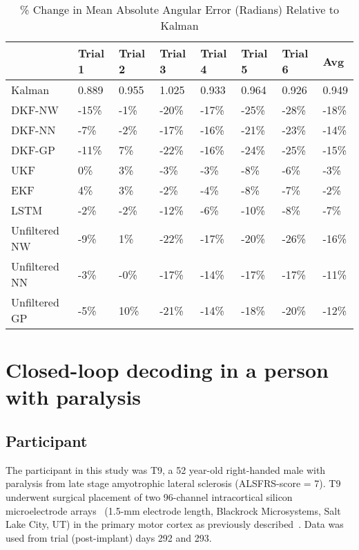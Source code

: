 \begin{table*}[ht]
\centering
\caption{\% Change in Mean Absolute Angular Error (Radians) Relative to Kalman}
\label{t:monkey_maae}
\begin{tabular}{|l|llllll|l|}
\hline
              & Trial 1 & Trial 2 & Trial 3 & Trial 4 & Trial 5 & Trial 6 & Avg   \\ \hline
Kalman        & 0.889   & 0.955   & 1.025   & 0.933   & 0.964   & 0.926   & 0.949 \\ \hline
DKF-NW        & -15\%   & -1\%    & -20\%   & -17\%   & -25\%   & -28\%   & -18\% \\
DKF-NN        & -7\%    & -2\%    & -17\%   & -16\%   & -21\%   & -23\%   & -14\% \\
DKF-GP        & -11\%   & 7\%     & -22\%   & -16\%   & -24\%   & -25\%   & -15\% \\ \hline
UKF           & 0\%     & 3\%     & -3\%    & -3\%    & -8\%    & -6\%    & -3\%  \\ 
EKF           & 4\%     & 3\%     & -2\%    & -4\%    & -8\%    & -7\%    & -2\%  \\ \hline
LSTM          & -2\%    & -2\%    & -12\%   & -6\%    & -10\%   & -8\%    & -7\%  \\ \hline
Unfiltered NW & -9\%    & 1\%     & -22\%   & -17\%   & -20\%   & -26\%   & -16\% \\ 
Unfiltered NN & -3\%    & -0\%    & -17\%   & -14\%   & -17\%   & -17\%   & -11\% \\ 
Unfiltered GP & -5\%    & 10\%    & -21\%   & -14\%   & -18\%   & -20\%   & -12\% \\ \hline
\end{tabular}
\end{table*}

\section{Closed-loop decoding in a person with paralysis} \label{s:human_data}  

\subsection{Participant}

The participant in this study was T9, a 52 year-old right-handed male with paralysis from late stage amyotrophic lateral sclerosis (ALSFRS-score = 7). T9 underwent surgical placement of two 96-channel intracortical silicon microelectrode arrays~\cite{May97} (1.5-mm electrode length, Blackrock Microsystems, Salt Lake City, UT) in the primary motor cortex as previously described~\cite{Kim08, Sim11}.  Data was used from trial (post-implant) days 292 and 293.

